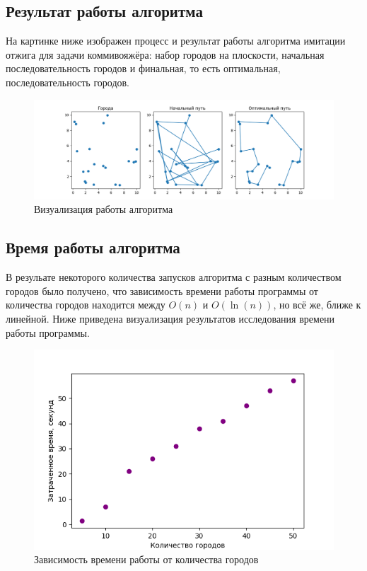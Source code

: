 \documentclass[14pt,a4paper]{scrartcl}
\begin{document}
	\subsection{Результат работы алгоритма}
	\begin{flushleft}
		На картинке ниже изображен процесс и результат работы алгоритма имитации отжига для задачи коммивояжёра: набор городов на плоскости, начальная последовательность городов и финальная, то есть оптимальная, последовательность городов.
		\begin{figure}[H]
			\centering
			\includegraphics[width=1.0\linewidth]{TSP}
			\caption{Визуализация работы алгоритма}
		\end{figure}
	\end{flushleft}
	\subsection{Время работы алгоритма}
	\begin{flushleft}
		В резульате некоторого количества запусков алгоритма с разным количеством городов было получено, что зависимость времени работы программы от количества городов находится между $O(n)$ и $O(\ln(n))$, но всё же, ближе к линейной. Ниже приведена визуализация результатов исследования времени работы программы.
		\begin{figure}[H]
			\centering
			\includegraphics[width=1.0\linewidth]{Elapsed_time}
			\caption{Зависимость времени работы от количества городов}
		\end{figure}
	\end{flushleft}
\end{document}
